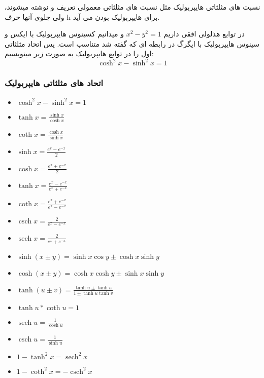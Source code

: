 \documentclass[12pt, a4paper, oneside]{article}
\DeclareMathOperator{\sech}{sech}
\DeclareMathOperator{\csch}{csch}
\begin{document}

نسبت های مثلثاتی هایپربولیک مثل نسبت های مثلثاتی معمولی تعریف و نوشته میشوند، ولی جلوی آنها حرف h برای هایپربولیک بودن می آید.

در توابع هذلولی افقی داریم $x^2 - y^2 = 1$ و میدانیم کسینوس هایپربولیک با ایکس و سینوس هایپربولیک با ایگرگ در رابطه ای که گفته شد متناسب است.
پس اتحاد مثلثاتی اول را در توابع هایپربولیک به صورت زیر مینویسیم: 
\[\cosh^2 x - \sinh^2 x = 1\]
\subsubsection{اتحاد های مثلثاتی هایپربولیک}
\begin{latin}
\begin{itemize}
    \item $\cosh^2 x - \sinh^2 x = 1$
    \item $\tanh x = \frac{\sinh x}{\cosh x}$
    \item $\coth x = \frac{\cosh x}{\sinh x}$
    \item $\sinh x = \frac{e^x - e^{-x}}{2}$
    \item $\cosh x = \frac{e^x + e^{-x}}{2}$
    \item $\tanh x = \frac{e^x - e^{-x}}{e^x + e^{-x}}$
    \item $\coth x = \frac{e^x + e^{-x}}{e^x - e^{-x}}$
    \item $\csch x = \frac{ 2 }{ e^x - e^{ -x } }$
    \item $\sech x = \frac{ 2 }{ e^x + e^{ -x } }$
    \item $\sinh(x \pm y) = \sinh x\cos y \pm \cosh x\sinh y$
    \item $\cosh(x \pm y) = \cosh x\cosh y \pm \sinh x\sinh y$
    \item $\tanh(u \pm v) = \frac{ \tanh u \pm \tanh u }{ 1 \pm \tanh u\tanh v }$
    \item $\tanh u * \coth u = 1$
    \item $\sech u = \frac{1}{ \cosh u }$
    \item $\csch u = \frac{1}{\sinh u }$
    \item $1-\tanh^2x = \sech^2x$
    \item $1-\coth^2x = -\csch^2x$
\end{itemize}
\end{latin}
\end{document}
